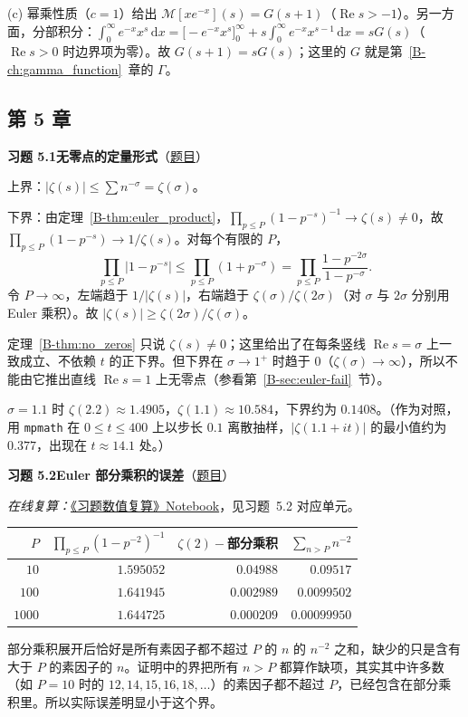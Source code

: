 \documentclass[11pt,a4paper]{article}
\newcommand{\dd}{\,\mathrm{d}}
\renewcommand{\Re}{\operatorname{Re}}
\newcommand{\bref}[1]{\ref*{B-#1}}
\newcommand{\Sol}[2]{%
  \par\addvspace{1.2em}\noindent
  \hypertarget{s:#1}{}\textbf{习题 #1\quad #2}\hfill{\small（\hyperlink{q:#1}{题目}）}\par
  \nopagebreak\smallskip}
\begin{document}
(c) 幂乘性质（$c=1$）给出 $\mathcal M[xe^{-x}](s)=G(s+1)$（$\Re s>-1$）。另一方面，分部积分：$\int_0^\infty e^{-x}x^{s}\dd x=\bigl[-e^{-x}x^s\bigr]_0^\infty+s\int_0^\infty e^{-x}x^{s-1}\dd x=sG(s)$（$\Re s>0$ 时边界项为零）。故 $G(s+1)=sG(s)$；这里的 $G$ 就是第~\bref{ch:gamma_function}~章的 $\Gamma$。

\subsection*{第 5 章}

\Sol{5.1}{无零点的定量形式}
上界：$|\zeta(s)|\le\sum n^{-\sigma}=\zeta(\sigma)$。

下界：由定理~\bref{thm:euler_product}，$\prod_{p\le P}(1-p^{-s})^{-1}\to\zeta(s)\ne0$，故 $\prod_{p\le P}(1-p^{-s})\to1/\zeta(s)$。对每个有限的 $P$，
\[
  \prod_{p\le P}|1-p^{-s}|\le\prod_{p\le P}(1+p^{-\sigma})=\prod_{p\le P}\frac{1-p^{-2\sigma}}{1-p^{-\sigma}} .
\]
令 $P\to\infty$，左端趋于 $1/|\zeta(s)|$，右端趋于 $\zeta(\sigma)/\zeta(2\sigma)$（对 $\sigma$ 与 $2\sigma$ 分别用 Euler 乘积）。故 $|\zeta(s)|\ge\zeta(2\sigma)/\zeta(\sigma)$。

定理~\bref{thm:no_zeros} 只说 $\zeta(s)\ne0$；这里给出了在每条竖线 $\Re s=\sigma$ 上一致成立、不依赖 $t$ 的正下界。但下界在 $\sigma\to1^+$ 时趋于 $0$（$\zeta(\sigma)\to\infty$），所以不能由它推出直线 $\Re s=1$ 上无零点（参看第~\bref{sec:euler-fail}~节）。

$\sigma=1.1$ 时 $\zeta(2.2)\approx1.4905$，$\zeta(1.1)\approx10.584$，下界约为 $0.1408$。（作为对照，用 \texttt{mpmath} 在 $0\le t\le400$ 上以步长 $0.1$ 离散抽样，$|\zeta(1.1+it)|$ 的最小值约为 $0.377$，出现在 $t\approx14.1$ 处。）

\Sol{5.2}{Euler 部分乘积的误差}
\emph{在线复算：}\href{https://colab.research.google.com/github/lichengtong123/lichengtong-RH/blob/main/\%E4\%B9\%A0\%E9\%A2\%98\%E4\%B8\%8E\%E8\%A7\%A3\%E7\%AD\%94/\%E4\%B9\%A0\%E9\%A2\%98\%E6\%95\%B0\%E5\%80\%BC\%E5\%A4\%8D\%E7\%AE\%97.ipynb}{《习题数值复算》Notebook}，见习题~5.2 对应单元。

\begin{center}
\begin{tabular}{rrrr}
\toprule
$P$ & $\prod_{p\le P}(1-p^{-2})^{-1}$ & $\zeta(2)-$部分乘积 & $\sum_{n>P}n^{-2}$\\
\midrule
$10$ & $1.595052$ & $0.04988$ & $0.09517$\\
$100$ & $1.641945$ & $0.002989$ & $0.0099502$\\
$1000$ & $1.644725$ & $0.000209$ & $0.00099950$\\
\bottomrule
\end{tabular}
\end{center}
部分乘积展开后恰好是所有素因子都不超过 $P$ 的 $n$ 的 $n^{-2}$ 之和，缺少的只是含有大于 $P$ 的素因子的 $n$。证明中的界把所有 $n>P$ 都算作缺项，其实其中许多数（如 $P=10$ 时的 $12,14,15,16,18,\dots$）的素因子都不超过 $P$，已经包含在部分乘积里。所以实际误差明显小于这个界。
\end{document}
